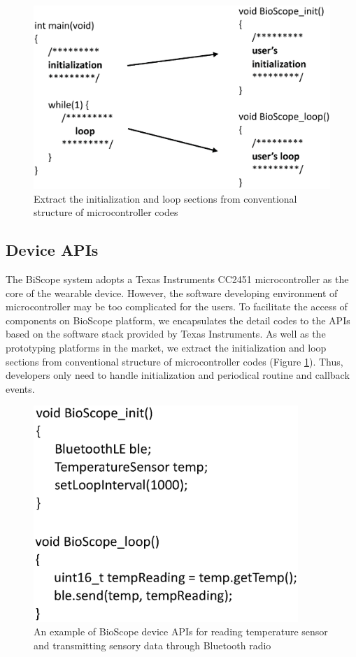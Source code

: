 \begin{figure}
\centering
\includegraphics[width=14cm]{image/mcu_codes.eps}
\caption{Extract the initialization and loop sections from conventional structure of microcontroller codes}
\label{fig_mcu_codes}
\end{figure}

\subsection{Device APIs}
The BiScope system adopts a Texas Instruments CC2451 microcontroller as the core of the wearable device.
However, the software developing environment of microcontroller may be too complicated for the users.
To facilitate the access of components on BioScope platform, we encapsulates the detail codes to the APIs based on the software stack provided by Texas Instruments.
As well as the prototyping platforms in the market, we extract the initialization and loop sections from conventional structure of microcontroller codes (Figure \ref{fig_mcu_codes}).
Thus, developers only need to handle initialization and periodical routine and  callback events.

\begin{figure}[ht]
\centering
\includegraphics[width=10cm]{image/mcu_temp.eps}
\caption{An example of BioScope device APIs for reading temperature sensor and transmitting sensory data through Bluetooth radio}
\label{fig_mcu_temp}
\end{figure}

